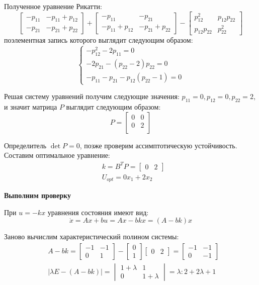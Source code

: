 \noindent Полученное уравнение Рикатти:
$$
    \begin{bmatrix}
        -p_{11} & -p_{11}+p_{12} \\ -p_{21} & -p_{21}+p_{22}
    \end{bmatrix} + \begin{bmatrix}
        -p_{11} & -p_{21} \\ -p_{11}+p_{12} & -p_{21}+p_{22}
    \end{bmatrix} - \begin{bmatrix} p_{12}^2 & p_{12}p_{22} \\ p_{12}p_{22} & p_{22}^2 \end{bmatrix}
$$
\noindent поэлементная запись которого выглядит следующим образом:
$$
    \begin{cases}
        -p_{12}^2-2 p_{11} = 0 \\
        -2 p_{21}-\left(p_{22}-2\right) p_{22} = 0 \\
        -p_{11}-p_{21}-p_{12} \left(p_{22}-1\right) = 0
    \end{cases}
$$

\noindent Решая систему уравнений получим следующие значения: $ p_{11}= 0, p_{12} = 0,p_{22} = 2 $, и значит матрица $ P $ выглядит следующим образом:
$$ 
P = \begin{bmatrix}
 0 & 0 \\
 0 & 2 \\
\end{bmatrix}
$$

\noindent Определитель $ \det P = 0 $, позже проверим ассимптотическую устойчивость. Составим оптимальное уравнение:
\begin{align*}
    &k=B^T P = \begin{bmatrix}
        0 & 2
    \end{bmatrix} \\
    &U_{opt}=0x_1+2x_2
\end{align*}

\textbf{Выполним проверку}

При $ u=-kx $ уравнения состояния имеют вид:
$$ \dot{x}=Ax+bu=Ax-bkx=(A-bk)x $$

\noindent Заново вычислим характеристический полином системы:
\begin{align*}
    &A-bk = \begin{bmatrix}
        -1 & -1 \\ 0 & 1
    \end{bmatrix} - \begin{bmatrix}
        0 \\ 1 
    \end{bmatrix} \begin{bmatrix}
        0 & 2
    \end{bmatrix} =\begin{bmatrix}
        -1 & -1 \\ 0 & -1
    \end{bmatrix} \\
    &| \lambda E - (A-bk) | = \begin{vmatrix}
        1+\lambda & 1 \\ 0 & 1+\lambda
    \end{vmatrix} = \lambda:2 + 2\lambda + 1
\end{align*}

